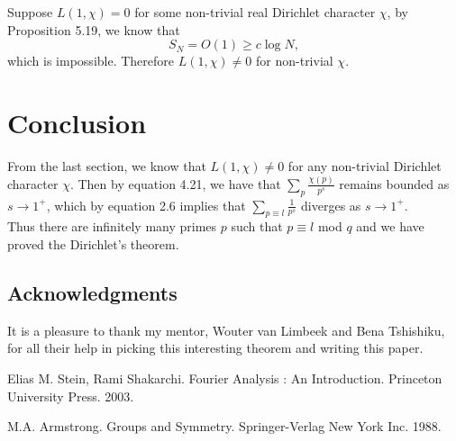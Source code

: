 \documentclass[psamsfonts]{amsart}
\theoremstyle{definition}
\theoremstyle{remark}
\numberwithin{equation}{section}
\begin{document}
			Suppose $L(1,\chi) = 0$ for some non-trivial real Dirichlet character $\chi$, by Proposition 5.19, we know that
			\begin{equation}
				S_N = O(1) \geq c\log N,
			\end{equation}
			which is impossible. Therefore $L(1,\chi) \neq 0$ for non-trivial $\chi$.
			
		\section{Conclusion}
			From the last section, we know that $L(1,\chi) \neq 0$ for any non-trivial Dirichlet character $\chi$. Then by equation 4.21, we have that $\sum_{p} \frac{\chi(p)}{p^s}$ remains bounded as $s \rightarrow 1^+$, which by equation 2.6 implies that $\sum_{p \equiv l} \frac{1}{p^s}$ diverges as $s \rightarrow 1^+$.\\
			Thus there are infinitely many primes $p$ such that $p \equiv l$ mod $q$ and we have proved the Dirichlet's theorem.
		
		\subsection*{Acknowledgments}  It is a pleasure to thank my mentor, 
Wouter van Limbeek and Bena Tshishiku, for all their help in picking this interesting theorem and writing this paper. 

	\begin{thebibliography}{9}

			Elias M. Stein, Rami Shakarchi.
			Fourier Analysis : An Introduction.
			Princeton University Press. 2003.
	
			M.A. Armstrong.
			Groups and Symmetry.
			Springer-Verlag New York Inc. 1988. 

\end{thebibliography}
		
\end{document}
